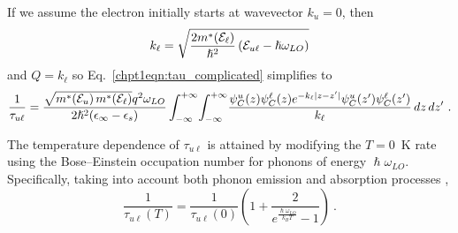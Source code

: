 \documentclass[12pt]{report}
\begin{document}
{If we assume the electron initially starts at wavevector $k_u=0$, then
\begin{equation}
k_\ell = \sqrt{\frac{2 m^*\!\left(\EE_\ell\right)}{\hslash^2} \left(\EE_{u\ell}-\hslash\omega_{{LO}}\right)}
\end{equation}
and $Q=k_\ell$ so Eq.~\eqref{chpt1eqn:tau_complicated} simplifies to
\begin{equation}
\frac{1}{\tau_{u\ell}} = \frac{\sqrt{m^*\!\left(\EE_u\right) m^*\!\left(\EE_\ell\right)} q^2 \omega_{{LO}}}{2 \hslash^2 (\epsilon_\infty - \epsilon_s)} \int_{-\infty}^{+\infty} \! \int_{-\infty}^{+\infty} \!  \frac{\psi_C^u(z) \psi_C^\ell (z) e^{-k_\ell|z-z'|} \psi_C^u(z') \psi_C^\ell (z')}{k_\ell}  \, dz \, dz' {~.}
\end{equation}

The temperature dependence of $\tau_{u\ell}$ is attained by modifying the $T=0$~K rate using the Bose--Einstein occupation number for phonons of energy $\hslash\omega_{LO}$.  Specifically, taking into account both phonon emission and absorption processes \cite{Ferreira:PRB:1989},
\begin{equation}
\frac{1}{\tau_{u\ell}(T)} = \frac{1}{\tau_{u\ell}(0)}  \left(1 + \frac{2}{e^{\frac{\hslash\omega_{LO}}{k_{B} T}}-1} \right) {~.}
\end{equation}




%
%


}
\end{document}
